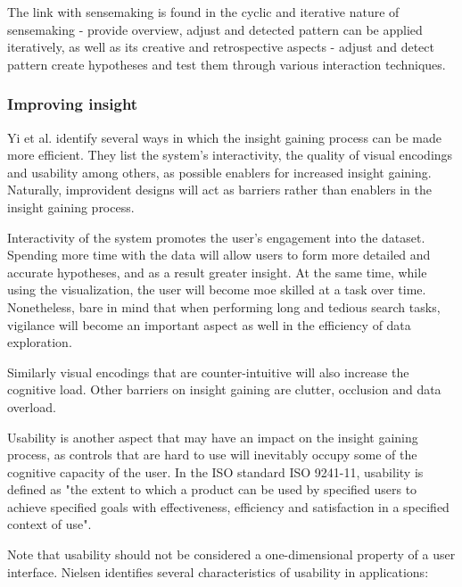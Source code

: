 The link with sensemaking is found in the cyclic and iterative nature of sensemaking - provide overview, adjust and detected pattern can be applied iteratively, as well as its creative and retrospective aspects - adjust and detect pattern create hypotheses and test them through various interaction techniques\cite{yi:2008}.


\subsubsection{Improving insight}\label{chapter:literature_study:section:user:subsection:insight:subsubsection:improving}

Yi et al. \cite{yi:2008} identify several ways in which the insight gaining process can be made more efficient. They list the system's interactivity, the quality of visual encodings and usability among others, as possible enablers for increased insight gaining. Naturally, improvident designs will act as barriers rather than enablers in the insight gaining process.

Interactivity of the system promotes the user's engagement into the dataset. Spending more time with the data will allow users to form more detailed and accurate hypotheses, and as a result greater insight\cite{yi:2008}. At the same time, while using the visualization, the user will become moe skilled at a task over time. Nonetheless, bare in mind that when performing long and tedious search tasks, vigilance will become an important aspect as well in the efficiency of data exploration\cite{ware:2004}.

Similarly visual encodings that are counter-intuitive will also increase the cognitive load. Other barriers on insight gaining are clutter, occlusion and data overload\cite{yi:2008}.

Usability is another aspect that may have an impact on the insight gaining process, as controls that are hard to use will inevitably occupy some of the cognitive capacity of the user\cite{yi:2008}. In the ISO standard ISO 9241-11, usability is defined as "the extent to which a product can be used by specified users to achieve specified goals with effectiveness, efficiency and satisfaction in a specified context of use"\cite{usabilitynet:2006:standards}.

Note that usability should not be considered a one-dimensional property of a user interface. Nielsen identifies several characteristics of usability in applications\cite{nielsen:1993:UE:529793}:

